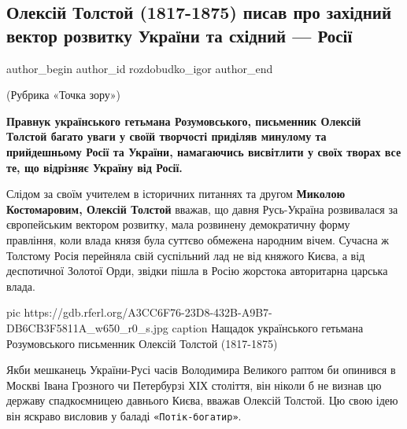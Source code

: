  
 
 
 
 
 
\subsection{Олексій Толстой (1817-1875) писав про західний вектор розвитку України та східний --- Росії}
\label{sec:29_11_2020.news.ua.radio_svoboda.rozdobudko_igor.1.russia_oleksii_tolstoj}
\ifcmt
  author_begin
   author_id rozdobudko_igor
  author_end
\fi


  

(Рубрика «Точка зору»)

\begin{leftbar}
  \bfseries
Правнук українського гетьмана Розумовського, письменник Олексій Толстой багато
уваги у своїй творчості приділяв минулому та прийдешньому Росії та України,
намагаючись висвітлити у своїх творах все те, що відрізняє Україну від Росії.
\end{leftbar}

Слідом за своїм учителем в історичних питаннях та другом \textbf{Миколою Костомаровим,
Олексій Толстой} вважав, що давня Русь-Україна розвивалася за європейським
вектором розвитку, мала розвинену демократичну форму правління, коли влада
князя була суттєво обмежена народним вічем. Сучасна ж Толстому Росія перейняла
свій суспільний лад не від княжого Києва, а від деспотичної Золотої Орди,
звідки пішла в Росію жорстока авторитарна царська влада.

\ifcmt
pic https://gdb.rferl.org/A3CC6F76-23D8-432B-A9B7-DB6CB3F5811A_w650_r0_s.jpg
caption Нащадок українського гетьмана Розумовського письменник Олексій Толстой (1817-1875)
\fi

Якби мешканець України-Русі часів Володимира Великого раптом би опинився в
Москві Івана Грозного чи Петербурзі ХІХ століття, він ніколи б не визнав цю
державу спадкоємницею давнього Києва, вважав Олексій Толстой. Цю свою ідею він
яскраво висловив у баладі \verb|«Потік-богатир»|.

